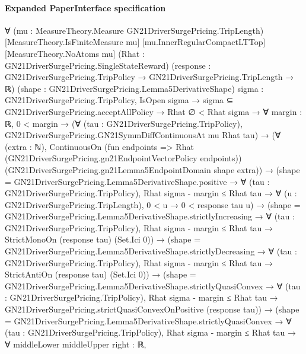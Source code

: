 \documentclass[10pt]{article}
\begin{document}
\paragraph{Expanded PaperInterface specification}
\begin{ReviewVerbatim}
∀ (mu : MeasureTheory.Measure GN21DriverSurgePricing.TripLength) [MeasureTheory.IsFiniteMeasure mu]
  [mu.InnerRegularCompactLTTop] [MeasureTheory.NoAtoms mu] (Rhat : GN21DriverSurgePricing.SingleStateReward)
  (response : GN21DriverSurgePricing.TripPolicy → GN21DriverSurgePricing.TripLength → ℝ)
  (shape : GN21DriverSurgePricing.Lemma5DerivativeShape) {sigma : GN21DriverSurgePricing.TripPolicy},
  IsOpen sigma →
    sigma ⊆ GN21DriverSurgePricing.acceptAllPolicy →
      Rhat ∅ < Rhat sigma →
        ∀ {margin : ℝ},
          0 < margin →
            (∀ (tau : GN21DriverSurgePricing.TripPolicy), GN21DriverSurgePricing.GN21SymmDiffContinuousAt mu Rhat tau) →
              (∀ (extra : ℕ),
                  ContinuousOn (fun endpoints => Rhat (GN21DriverSurgePricing.gn21EndpointVectorPolicy endpoints))
                    (GN21DriverSurgePricing.gn21Lemma5EndpointDomain shape extra)) →
                (shape = GN21DriverSurgePricing.Lemma5DerivativeShape.positive →
                    ∀ (tau : GN21DriverSurgePricing.TripPolicy),
                      Rhat sigma - margin ≤ Rhat tau →
                        ∀ (u : GN21DriverSurgePricing.TripLength), 0 < u → 0 < response tau u) →
                  (shape = GN21DriverSurgePricing.Lemma5DerivativeShape.strictlyIncreasing →
                      ∀ (tau : GN21DriverSurgePricing.TripPolicy),
                        Rhat sigma - margin ≤ Rhat tau → StrictMonoOn (response tau) (Set.Ici 0)) →
                    (shape = GN21DriverSurgePricing.Lemma5DerivativeShape.strictlyDecreasing →
                        ∀ (tau : GN21DriverSurgePricing.TripPolicy),
                          Rhat sigma - margin ≤ Rhat tau → StrictAntiOn (response tau) (Set.Ici 0)) →
                      (shape = GN21DriverSurgePricing.Lemma5DerivativeShape.strictlyQuasiConvex →
                          ∀ (tau : GN21DriverSurgePricing.TripPolicy),
                            Rhat sigma - margin ≤ Rhat tau →
                              GN21DriverSurgePricing.strictQuasiConvexOnPositive (response tau)) →
                        (shape = GN21DriverSurgePricing.Lemma5DerivativeShape.strictlyQuasiConvex →
                            ∀ (tau : GN21DriverSurgePricing.TripPolicy),
                              Rhat sigma - margin ≤ Rhat tau →
                                ∀ {middleLower middleUpper right : ℝ},

\end{ReviewVerbatim}
\end{document}
